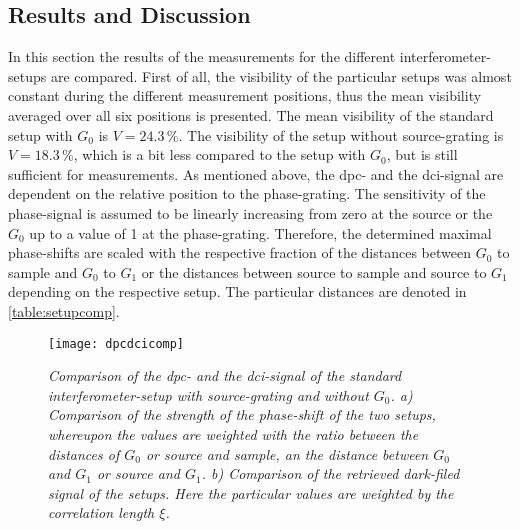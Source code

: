\subsection{Results and Discussion}
In this section the results of the measurements for the different interferometer-setups are compared. First of all, the visibility of the particular setups was almost constant during the different measurement positions, thus the mean visibility averaged over all six positions is presented. The mean visibility of the standard setup with $G_{0}$ is $V = 24.3\,$\%. The visibility of the setup without source-grating is $V = 18.3\,$\%, which is a bit less compared to the setup with $G_{0}$, but is still sufficient for measurements. As mentioned above, the \gls{dpc}- and the \gls{dci}-signal are dependent on the relative position to the phase-grating. The sensitivity of the phase-signal is assumed to be linearly increasing from zero at the source or the $G_{0}$ up to a value of 1 at the phase-grating. Therefore, the determined maximal phase-shifts are scaled with the respective fraction of the distances between $G_{0}$ to sample and $G_{0}$ to $G_{1}$ or the distances between source to sample and source to $G_{1}$ depending on the respective setup. The particular distances are denoted in \ref{table:setupcomp}.
\begin{figure}%
	\begin{center}
		\texttt{[image: dpcdcicomp]}
	\end{center}
	\caption[Comparison of \gls{dpc}- and \gls{dci}-signal of the interferometer-setup with $G_{0}$ and without $G_{0}$]{\textit{Comparison of the \gls{dpc}- and the \gls{dci}-signal of the standard interferometer-setup with source-grating and without $G_{0}$. a) Comparison of the strength of the phase-shift of the two setups, whereupon the values are weighted with the ratio between the distances of $G_{0}$ or source and sample, an the distance between $G_{0}$ and $G_{1}$ or source and $G_{1}$. b) Comparison of the retrieved dark-filed signal of the setups. Here the particular values are weighted by the correlation length $\xi$.}}
	\label{dpcdci}
\end{figure}  
